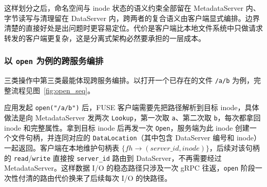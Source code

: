 这样划分之后，命名空间与 inode 状态的语义约束全部留在 MetadataServer 内、字节读写与清理留在 DataServer 内，跨两者的复合语义由客户端显式编排。边界清楚的直接好处是出问题时更容易定位。代价是客户端比本地文件系统中只做请求转发的客户端更复杂，这是分离式架构必然要承担的一层成本。

\subsubsection{以 \texttt{open} 为例的跨服务编排}

三类操作中第三类最能体现跨服务编排。以打开一个已存在的文件 \texttt{/a/b} 为例，完整流程见图~\ref{fig:open_seq}。

应用发起 \texttt{open("/a/b")} 后，FUSE 客户端需要先把路径解析到目标 inode，具体做法是向 MetadataServer 发两次 \texttt{Lookup}，第一次取 \texttt{a}、第二次取 \texttt{b}，每次都拿回 inode 和完整属性。拿到目标 inode 后再发一次 \texttt{Open}，服务端为此 inode 创建一个文件句柄，并连同对应的 \texttt{DataLocation}（其中包含 DataServer 编号和 inode）一起返回。客户端在本地维护句柄表 $\{fh \to (server\_id, inode)\}$，后续对该句柄的 \texttt{read}/\texttt{write} 直接按 \texttt{server\_id} 路由到 DataServer，不再需要经过 MetadataServer。这样数据 I/O 的稳态路径只涉及一次 gRPC 往返，\texttt{open} 阶段一次性付清的路由代价换来了后续每次 I/O 的快路径。

